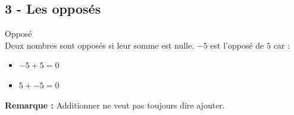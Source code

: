 \subsection*{3 - Les opposés}

\begin{Definition}{Opposé}\\
  Deux nombres sont opposés si leur somme est nulle. \newline
  $-5$ est l'opposé de $5$ car :

  \begin{itemize}[label={$\bullet$}]
    \item $-5 + 5 = 0$
    \item $5 + -5 = 0$ 
  \end{itemize} 
\end{Definition}

\textbf{Remarque : } Additionner ne veut pas toujours dire ajouter. 

